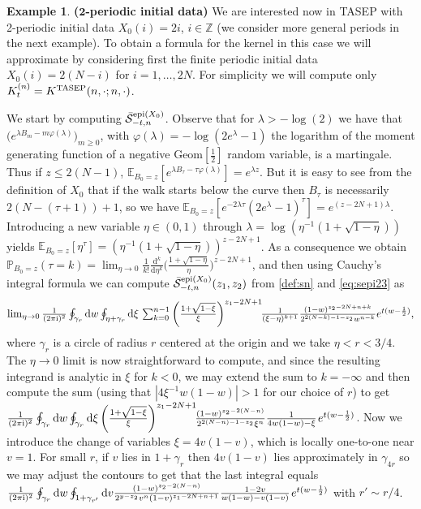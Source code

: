 \documentclass[letterpaper,reqno,11pt,oneside,final]{amsart}
\theoremstyle{definition}
\newtheorem{ex}[thm]{Example}
\newcommand{\I}{\uptext{i}}
\newcommand{\pp}{\mathbb{P}}
\newcommand{\ee}{\mathbb{E}}
\newcommand{\zz}{\mathbb{Z}}
\newcommand{\ts}{\hspace{0.1em}}
\newcommand{\uptext}[1]{\text{\upshape{#1}}}
\DeclareMathOperator{\epi}{\uptext{epi}}
\DeclareMathOperator{\oepi}{\epi}
\renewcommand{\d}{\mathrm{d}}
\newcommand{\TASEP}{\uptext{TASEP}}
\newcommand{\SN}{\bar{\mathcal{S}}}
\numberwithin{equation}{section}
\begin{document}
\begin{ex}{\bf ($\bm{2}$-periodic initial data)}
\enspace We are interested now in TASEP with 2-periodic initial data $X_0(i)=2i$, $i\in\zz$ (we consider more general periods in the next example).
To obtain a formula for the kernel in this case we will approximate by considering first the finite periodic initial data $X_0(i) = 2(N-i)$ for $i=1,\dotsc,2N$.
For simplicity we will compute only $K^{(n)}_t=K^\TASEP(n,\cdot;n,\cdot)$. 

\noindent We start by computing ${\SN}_{-t,n}^{\oepi(X_0)}$.
Observe that for $\lambda>-\log(2)$ we have that $\big(e^{\lambda B_m-m\varphi(\lambda)}\big)_{m\geq0}$, with $\varphi(\lambda)=-\log(2e^\lambda-1)$ the logarithm of the moment generating function of a negative Geom$[\frac12]$ random variable, is a martingale.
Thus if $z\leq 2(N-1)$, $\ee_{B_0=z}[e^{\lambda B_\tau-\tau\varphi(\lambda)}]=e^{\lambda z}$.
But it is easy to see from the definition of $X_0$ that if the walk starts below the curve then $B_\tau$ is necessarily $2(N-(\tau+1))+1$, so we have $\ee_{B_0=z}[e^{-2 \lambda \tau}(2e^{\lambda}-1)^\tau]=e^{(z-2N+1)\lambda}$.
Introducing a new variable $\eta\in(0,1)$ through $\lambda=\log(\eta^{-1}(1+\sqrt{1-\eta}))$ yields $\ee_{B_0=z}[\eta^\tau]=\left(\eta^{-1}(1+\sqrt{1-\eta})\right)^{z-2N+1}$.
As a consequence we obtain \mbox{$\pp_{B_0=z}(\tau=k)=\lim_{\eta\to0}\frac1{k!}\frac{\d^k}{\d\eta^k}\big(\frac{1+\sqrt{1-\eta}}{\eta}\big)^{z-2N+1}$}, and then using Cauchy's integral formula we can compute ${\SN}_{-t,n}^{\oepi(X_0)}(z_1,z_2)$ from \eqref{def:sn} and \eqref{eq:sepi23} as
\[\textstyle\lim_{\eta\to0}\frac1{(2\pi\I)^2}\oint_{\gamma_r} \d w\oint_{\eta+\gamma_{r}}\d\xi\,\sum_{k=0}^{n-1}\left(\frac{1+\sqrt{1-\xi}}{\xi}\right)^{z_1-2N+1}\!\!\frac1{(\xi-\eta)^{k+1}}\frac{(1-w)^{z_2-2N+n+k}}{2^{2(N-k)-1-z_2}w^{n-k}}e^{t(w-\frac12)},\]
where $\gamma_r$ is a circle of radius $r$ centered at the origin and we take $\eta<r<3/4$.
The $\eta\to0$ limit is now straightforward to compute, and since the resulting integrand is analytic in $\xi$ for $k<0$, we may extend the sum to $k=-\infty$ and then compute the sum (using that $|4\xi^{-1}w(1-w)|>1$ for our choice of $r$) to get
$\frac1{(2\pi\I)^2}\oint_{\gamma_r} \d w\oint_{\gamma_{r}}\d\xi\left(\frac{1+\sqrt{1-\xi}}{\xi}\right)^{z_1-2N+1}\!\!\frac{(1-w)^{z_2-2(N-n)}}{2^{2(N-n)-1-z_2}\xi^n}\frac1{4w(1-w)-\xi}\ts e^{t(w-\frac12)}$.
Now we introduce the change of variables $\xi=4v(1-v)$, which is locally one-to-one near $v=1$.
For small $r$, if $v$ lies in $1+\gamma_r$ then $4v(1-v)$ lies approximately in $\gamma_{4r}$ so we may adjust the contours to get that the last integral equals $\frac1{(2\pi\I)^2}\oint_{\gamma_r} \d w\oint_{1+\gamma_{r'}}\d v\frac{(1-w)^{z_2-2(N-n)}}{2^{y-z_2}v^n(1-v)^{z_1-2N+n+1}}\frac{1-2v}{w(1-w)-v(1-v)}\ts e^{t(w-\frac12)}$ with $r'\sim r/4$.

\end{ex}
\end{document}

